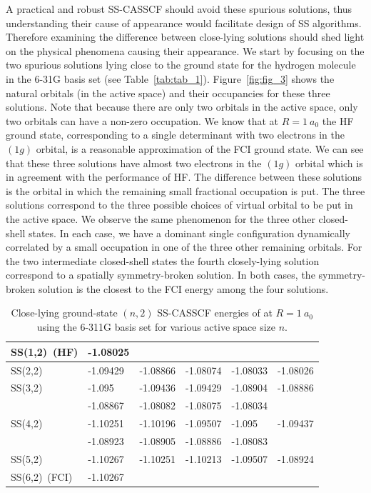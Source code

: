 \documentclass[aps,prb,reprint,showkeys,superscriptaddress]{revtex4-1}
\begin{document}
A practical and robust SS-CASSCF should avoid these spurious solutions, thus understanding their cause of appearance would facilitate design of SS algorithms.
Therefore examining the difference between close-lying solutions should shed light on the physical phenomena causing their appearance.
We start by focusing on the two spurious solutions lying close to the ground state for the hydrogen molecule in the 6-31G basis set (see Table~\ref{tab:tab_1}).
Figure~\ref{fig:fig_3} shows the natural orbitals (in the active space) and their occupancies for these three solutions.
Note that because there are only two orbitals in the active space, only two orbitals can have a non-zero occupation.
We know that at $R=1~a_0$ the HF ground state, corresponding to a single determinant with two electrons in the $(1g)$ orbital, is a reasonable approximation of the FCI ground state.
We can see that these three solutions have almost two electrons in the $(1g)$ orbital which is in agreement with the performance of HF.
The difference between these solutions is the orbital in which the remaining small fractional occupation is put.
The three solutions correspond to the three possible choices of virtual orbital to be put in the active space.
We observe the same phenomenon for the three other closed-shell states.
In each case, we have a dominant single configuration dynamically correlated by a small occupation in one of the three other remaining orbitals.
For the two intermediate closed-shell states the fourth closely-lying solution correspond to a spatially symmetry-broken solution.
In both cases, the symmetry-broken solution is the closest to the FCI energy among the four solutions.

\begin{table}[b]
  \caption{Close-lying ground-state $(n,2)$ SS-CASSCF energies of  at $R=1~a_0$ using the 6-311G basis set for various active space size $n$.}
  \begin{ruledtabular}
    \label{tab:tab_2}
    \begin{tabular}{llllll}
      SS(1,2)~(HF) & -1.08025 & & & &\\
      \hline
      SS(2,2) & -1.09429 & -1.08866 & -1.08074 & -1.08033 & -1.08026 \\
      \hline
      SS(3,2) & -1.095 & -1.09436 & -1.09429 & -1.08904 & -1.08886 \\
                   & -1.08867 & -1.08082 & -1.08075 & -1.08034 & \\
      \hline
      SS(4,2) & -1.10251 & -1.10196 & -1.09507 & -1.095 & -1.09437 \\
          & -1.08923 & -1.08905 & -1.08886 & -1.08083 &  \\
      \hline
      SS(5,2) & -1.10267 & -1.10251 & -1.10213 & -1.09507 & -1.08924 \\
      \hline
      SS(6,2)~(FCI) & -1.10267 & & & &\\
    \end{tabular}
  \end{ruledtabular}
\end{table}
\end{document}
